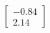 \documentclass[preview]{standalone}
\begin{document}
\begin{align*}
\begin{bmatrix} -0.84 \\ 2.14 \end{bmatrix}
\end{align*}
\end{document}

